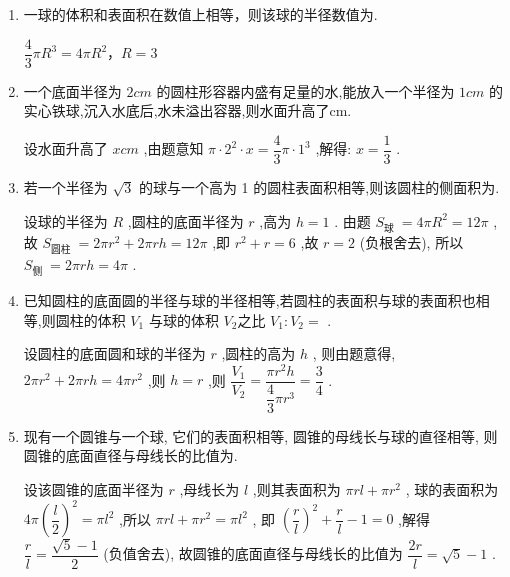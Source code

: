 \begin{enumerate}
    \item 一球的体积和表面积在数值上相等，则该球的半径数值为.
    \begin{jieda}
        $\dfrac{4}{3}\pi R^3 = 4\pi R^2$，$R = 3$
    \end{jieda}
    \item 一个底面半径为 $2{{cm}}$ 的圆柱形容器内盛有足量的水,能放入一个半径为 $1{{cm}}$ 的实心铁球,沉入水底后,水未溢出容器,则水面升高了cm.
    \begin{jieda}
        设水面升高了 $x{{cm}}$ ,由题意知 $\pi  \cdot  {2}^{2} \cdot  x = \dfrac{4}{3}\pi  \cdot  {1}^{3}$ ,解得: $x = \dfrac{1}{3}$ .
    \end{jieda}
    \item 若一个半径为 $\sqrt{3}$ 的球与一个高为 1 的圆柱表面积相等,则该圆柱的侧面积为\blkda{$4\pi$}.
    \begin{jieda}
        设球的半径为 $R$ ,圆柱的底面半径为 $r$ ,高为 $h = 1$ .
        由题 ${S}_{\text{球 }} = {4\pi }{R}^{2} = {12\pi }$ ,故 ${S}_{\text{圆柱 }} = {2\pi }{r}^{2} + {2\pi rh} = {12\pi }$ ,即 ${r}^{2} + r = 6$ ,故 $r = 2$ (负根舍去),
        所以 ${S}_{\text{侧 }} = {2\pi rh} = {4\pi }$ .
    \end{jieda}
    \item 已知圆柱的底面圆的半径与球的半径相等,若圆柱的表面积与球的表面积也相等,则圆柱的体积 ${V}_{1}$ 与球的体积 ${V}_{2}$之比 ${V}_{1} : {V}_{2} =$ .
    \begin{jieda}
        设圆柱的底面圆和球的半径为 $r$ ,圆柱的高为 $h$ ,
        则由题意得, ${2\pi }{r}^{2} + {2\pi rh} = {4\pi }{r}^{2}$ ,则 $h = r$ ,则 $\dfrac{{V}_{1}}{{V}_{2}} = \dfrac{\pi {r}^{2}h}{\dfrac{4}{3}\pi {r}^{3}} = \dfrac{3}{4}$ .
    \end{jieda}
    
    \item 现有一个圆锥与一个球, 它们的表面积相等, 圆锥的母线长与球的直径相等, 则圆锥的底面直径与母线长的比值为.
    \begin{jieda}
        设该圆锥的底面半径为 $r$ ,母线长为 $l$ ,则其表面积为 ${\pi rl} + \pi {r}^{2}$ ,
        球的表面积为 ${4\pi }{\left( \dfrac{l}{2}\right) }^{2} = \pi {l}^{2}$ ,所以 ${\pi rl} + \pi {r}^{2} = \pi {l}^{2}$ ,
        即 ${\left( \dfrac{r}{l}\right) }^{2} + \dfrac{r}{l} - 1 = 0$ ,解得 $\dfrac{r}{l} = \dfrac{\sqrt{5} - 1}{2}$ (负值舍去),
        故圆锥的底面直径与母线长的比值为 $\dfrac{2r}{l} = \sqrt{5} - 1$ .
    \end{jieda}
    

\end{enumerate}
